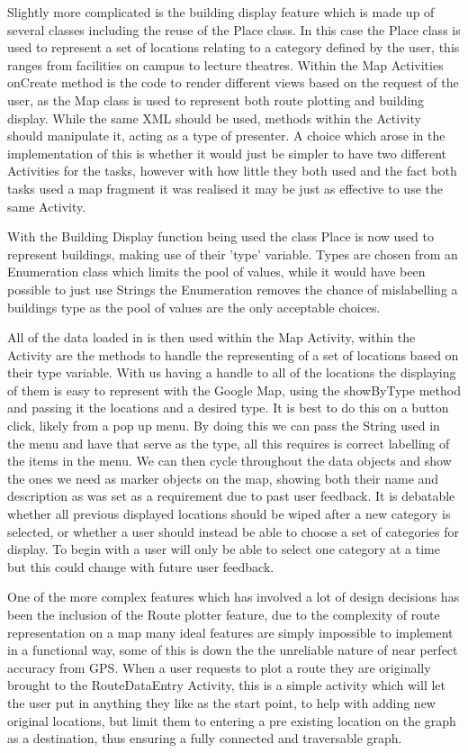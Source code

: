 Slightly more complicated is the building display feature which is made up of several classes including the reuse of the Place class. In this case the Place class is used to represent a set of locations relating to a category defined by the user, this ranges from facilities on campus to lecture theatres. Within the Map Activities onCreate method is the code to render different views based on the request of the user, as the Map class is used to represent both route plotting and building display. While the same XML should be used, methods within the Activity should manipulate it, acting as a type of presenter. A choice which arose in the implementation of this is whether it would just be simpler to have two different Activities for the tasks, however with how little they both used and the fact both tasks used a map fragment it was realised it may be just as effective to use the same Activity. 

With the Building Display function being used the class Place is now used to represent buildings, making use of their 'type' variable. Types are chosen from an Enumeration class which limits the pool of values, while it would have been possible to just use Strings the Enumeration removes the chance of mislabelling a buildings type as the pool of values are the only acceptable choices.

All of the data loaded in is then used within the Map Activity, within the Activity are the methods to handle the representing of a set of locations based on their type variable. With us having a handle to all of the locations the displaying of them is easy to represent with the Google Map\cite{maps}, using the showByType method and passing it the locations and a desired type. It is best to do this on a button click, likely from a pop up menu. By doing this we can pass the String used in the menu and have that serve as the type, all this requires is correct labelling of the items in the menu. We can then cycle throughout the data objects and show the ones we need as marker objects on the map, showing both their name and description as was set as a requirement due to past user feedback. It is debatable whether all previous displayed locations should be wiped after a new category is selected, or whether a user should instead be able to choose a set of categories for display. To begin with a user will only be able to select one category at a time but this could change with future user feedback. 

One of the more complex features which has involved a lot of design decisions has been the inclusion of the Route plotter feature, due to the complexity of route representation on a map many ideal features are simply impossible to implement in a functional way, some of this is down the the unreliable nature of near perfect accuracy from GPS\cite{gps}. When a user requests to plot a route they are originally brought to the RouteDataEntry Activity, this is a simple activity which will let the user put in anything they like as the start point, to help with adding new original locations, but limit them to entering a pre existing location on the graph as a destination, thus ensuring a fully connected and traversable graph.

